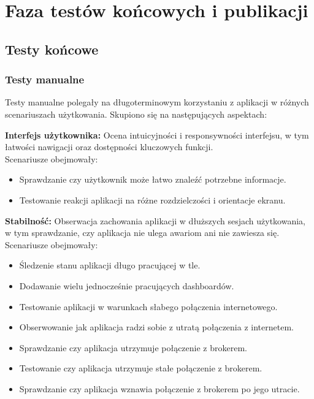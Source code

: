 \section{Faza testów końcowych i publikacji}

\subsection{Testy końcowe}
\subsubsection{Testy manualne}
Testy manualne polegały na długoterminowym korzystaniu z aplikacji w różnych scenariuszach użytkowania. Skupiono się na następujących aspektach:\\

\hspace{3em}

\textbf{Interfejs użytkownika:} Ocena intuicyjności i responsywności interfejsu, w tym łatwości nawigacji oraz dostępności kluczowych funkcji.\\

Scenariusze obejmowały:

\begin{itemize}[leftmargin=*]
    \item Sprawdzanie czy użytkownik może łatwo znaleźć potrzebne informacje.
    \item Testowanie reakcji aplikacji na różne rozdzielczości i orientacje ekranu.
\end{itemize}

\hspace{3em}

\textbf{Stabilność:} Obserwacja zachowania aplikacji w dłuższych sesjach użytkowania, w tym sprawdzanie, czy aplikacja nie ulega awariom ani nie zawiesza się.\\

Scenariusze obejmowały:

\begin{itemize}[leftmargin=*]
    \item Śledzenie stanu aplikacji długo pracującej w tle.
    \item Dodawanie wielu jednocześnie pracujących dashboardów.
    \item Testowanie aplikacji w warunkach słabego połączenia internetowego.
    \item Obserwowanie jak aplikacja radzi sobie z utratą połączenia z internetem.
    \item Sprawdzanie czy aplikacja utrzymuje połączenie z brokerem.
    \item Testowanie czy aplikacja utrzymuje stałe połączenie z brokerem.
    \item Sprawdzanie czy aplikacja wznawia połączenie z brokerem po jego utracie.
\end{itemize}

